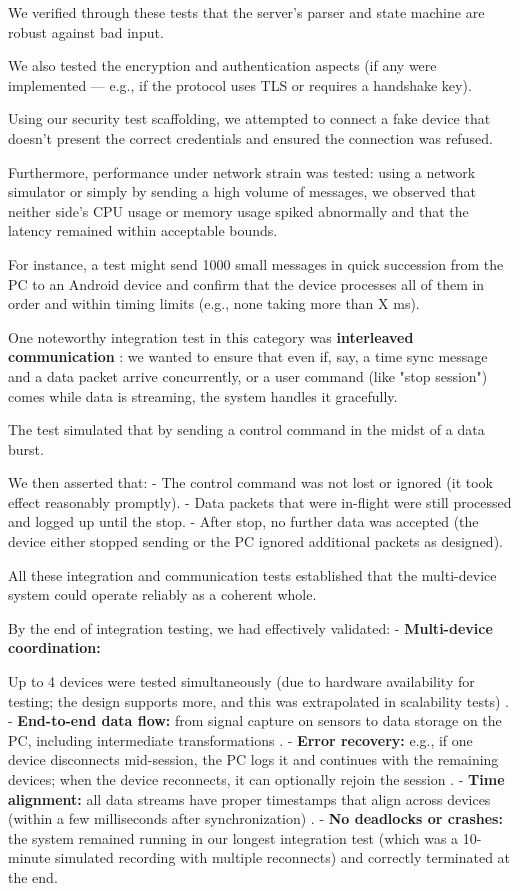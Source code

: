 {{We verified through these tests that the server's parser and state machine are
robust against bad input.

We also tested the encryption and authentication aspects (if any were
implemented --- e.g., if the protocol uses TLS or requires a handshake key).

Using our security test scaffolding, we attempted to connect a fake device that
doesn't present the correct credentials and ensured the connection was refused.

Furthermore, performance under network strain was tested: using a network
simulator or simply by sending a high volume of messages, we observed that
neither side's CPU usage or memory usage spiked abnormally and that the latency
remained within acceptable bounds.

For instance, a test might send 1000 small messages in quick succession from the
PC to an Android device and confirm that the device processes all of them in
order and within timing limits (e.g., none taking more than X ms).

One noteworthy integration test in this category was \textbf{interleaved communication}
: we wanted to ensure that even if, say, a time sync message and a data packet
arrive concurrently, or a user command (like "stop session") comes while data is
streaming, the system handles it gracefully.

The test simulated that by sending a control command in the midst of a data
burst.

We then asserted that: - The control command was not lost or ignored (it took
effect reasonably promptly). - Data packets that were in-flight were still
processed and logged up until the stop. - After stop, no further data was
accepted (the device either stopped sending or the PC ignored additional packets
as designed).

All these integration and communication tests established that the multi-device
system could operate reliably as a coherent whole.

By the end of integration testing, we had effectively validated: - \textbf{Multi-device coordination:}

Up to 4 devices were tested simultaneously (due to hardware availability for testing; the design supports more, and this was extrapolated in scalability tests)
. - \textbf{End-to-end data flow:}
from signal capture on sensors to data storage on the PC, including intermediate transformations
. - \textbf{Error recovery:}
e.g., if one device disconnects mid-session, the PC logs it and continues with the remaining devices; when the device reconnects, it can optionally rejoin the session
. - \textbf{Time alignment:}
all data streams have proper timestamps that align across devices (within a few milliseconds after synchronization)
. - \textbf{No deadlocks or crashes:}
the system remained running in our longest integration test (which was a
10-minute simulated recording with multiple reconnects) and correctly terminated
at the end.

}}
